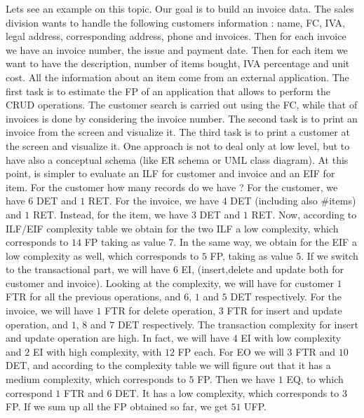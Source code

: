 Lets see an example on this topic. Our goal is to build an invoice data. The sales division wants to handle the following customers information : name, FC, IVA, legal address, corresponding address, phone and invoices. Then for each invoice we have an invoice number, the issue and payment date. Then for each item we want to have the description, number of items bought, IVA percentage and unit cost. All the information about an item come from an external application. The first task is to estimate the FP of an application that allows to perform the CRUD operations. The customer search is carried out using the FC, while that of invoices is done by considering the invoice number. The second task is to print an invoice from the screen and visualize it. The third task is to print a customer at the screen and visualize it. One approach is not to deal only at low level, but to have also a conceptual schema (like ER schema or UML class diagram). At this point, is simpler to evaluate an ILF for customer and invoice and an EIF for item. For the customer how many records do we have ? For the customer, we have $6$ DET and $1$ RET. For the invoice, we have $4$ DET (including also $\#$items) and $1$ RET. Instead, for the item, we have $3$ DET and $1$ RET. Now, according to ILF/EIF complexity table we  obtain for the two ILF a low complexity, which corresponds to $14$ FP taking as value $7$. In the same way, we obtain for the EIF a low complexity as well, which corresponds to $5$ FP, taking as value $5$. If we switch to the transactional part, we will have 6 EI, (insert,delete and update both for customer and invoice). Looking at the complexity, we will have for customer $1$ FTR for all the previous operations, and $6$, $1$ and $5$ DET respectively. For the invoice, we will have $1$ FTR for delete operation, $3$ FTR for insert and update operation, and $1$, $8$ and $7$ DET respectively. The transaction complexity for insert and update operation are high. In fact, we will have $4$ EI with low complexity and $2$ EI with high complexity, with $12$ FP each. For EO we will $3$ FTR and $10$ DET, and according to the complexity table we will figure out that it has a medium complexity, which corresponds to $5$ FP. Then we have $1$ EQ, to which correspond $1$ FTR and $6$ DET. It has a low complexity, which corresponds to $3$ FP. If we sum up all the FP obtained so far, we get $51$ UFP.
